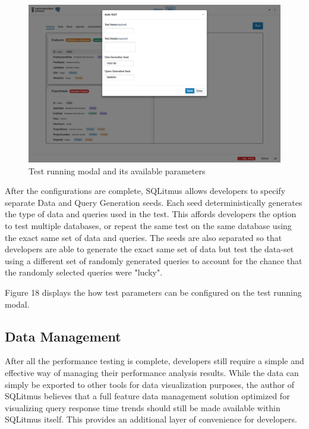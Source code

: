 \documentclass[12pt]{article}
\begin{document}
\begin{spacing}{1.9}
	\begin{figure}[H]
		\centering
		\includegraphics[width=\textwidth]{3-5.png}
		\caption{ Test running modal and its available parameters }
		
	\end{figure}
	
	After the configurations are complete, SQLitmus allows developers to specify separate Data and Query Generation seeds. Each seed deterministically generates the type of data and queries used in the test. This affords developers the option to test multiple databases, or repeat the same test on the same database using the exact same set of data and queries. The seeds are also separated so that developers are able to generate the exact same set of data but test the data-set using a different set of randomly generated queries to account for the chance that the randomly selected queries were "lucky".
	
	Figure 18 displays the how test parameters can be configured on the test running modal.
	
	\subsection{ Data Management}
	
	After all the performance testing is complete, developers still require a simple and effective way of managing their performance analysis results. While the data can simply be exported to other tools for data visualization purposes, the author of SQLitmus believes that a full feature data management solution optimized for visualizing query response time trends should still be made available within SQLitmus itself. This provides an additional layer of convenience for developers.
	

\end{spacing}
\end{document}
